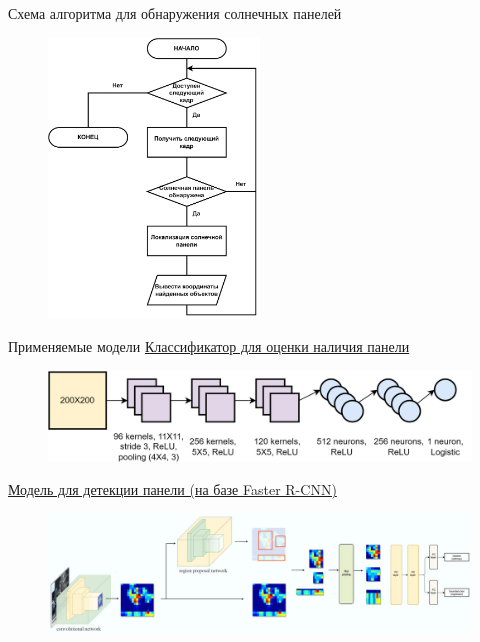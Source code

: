 \documentclass[10pt]{beamer}
\begin{document}
        \begin{frame}{Схема алгоритма для обнаружения солнечных панелей}
            \begin{figure}
                \centering
                \includegraphics[width=0.5\textwidth]{pic4-16a.png}
            \end{figure}
        \end{frame}

        \begin{frame}{Применяемые модели}
            \underline{Классификатор для оценки наличия панели}
            \begin{figure}
                \centering
                \includegraphics[width=1\textwidth]{pic4-19.png}
            \end{figure}
            \underline{Модель для детекции панели (на базе Faster R-CNN)}
            \begin{figure}
                \centering
                \includegraphics[width=1\textwidth]{pic4-21.jpg}
            \end{figure}
        \end{frame}
\end{document}
